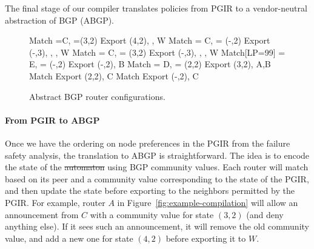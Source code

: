 \documentclass[10pt]{sigalternate052015} %
\newcommand{\para}[1]{\paragraph*{\textbf{#1}}}
\providecommand{\DIFadd}[1]{{\protect\color{blue}\uwave{#1}}} %
\providecommand{\DIFdel}[1]{{\protect\color{red}\sout{#1}}}                      %
\providecommand{\DIFaddbegin}{} %
\providecommand{\DIFaddend}{} %
\providecommand{\DIFdelbegin}{} %
\providecommand{\DIFdelend}{} %
\begin{document}

The final stage of our compiler translates policies from PGIR to a vendor-neutral abstraction of BGP (ABGP).

\DIFaddbegin \begin{figure}[t!]
\begin{code}
    Match \PEER=C, \COMM=(3,2)
      Export \COMM \Arrow (4,2), 
             \MED {}, \PEER \Arrow W
    Match \PEER = C, \COMM = (-,2)
      Export \COMM \Arrow (-,3), \COMM \Arrow {},
             \MED {}, \PEER \Arrow W
    Match \PEER = C, \COMM = (3,2)
      Export \COMM \Arrow (-,3), \COMM \Arrow {},
             \MED {}, \PEER \Arrow W
    Match[LP=99] \PEER = E, \COMM = (-,2) 
      Export \COMM \Arrow (-,2), \PEER \Arrow B
    Match \PEER = D, \COMM = (2,2)
      Export \COMM \Arrow (3,2), \PEER \Arrow A,B
    Match 
      Export \COMM \Arrow (2,2), \PEER \Arrow C
    Match 
      Export \COMM \Arrow (-,2), \PEER \Arrow C
  \end{code}
  \vspace{-2em} 
  \caption{Abstract BGP router configurations. \label{fig:abgp-config}}
  \vspace{-1em}
\end{figure}

\DIFaddend \para{From PGIR to ABGP}

Once we have the ordering on node preferences in the PGIR from the failure safety analysis, the translation to ABGP is straightforward. The idea is to encode the state of the \DIFdelbegin \DIFdel{automaton }\DIFdelend \DIFaddbegin \DIFadd{automata }\DIFaddend using BGP community values. Each router will match based on its peer and a community value corresponding to the state of the PGIR, and then update the state before exporting to the neighbors permitted by the PGIR. For example, router $A$ in Figure~\ref{fig:example-compilation} will allow an announcement from $C$ with a community value for state $(3,2)$ (and deny anything else). If it sees such an announcement, it will remove the old community value, and add a new one for state $(4,2)$ before exporting it to $W$.
\end{document}
